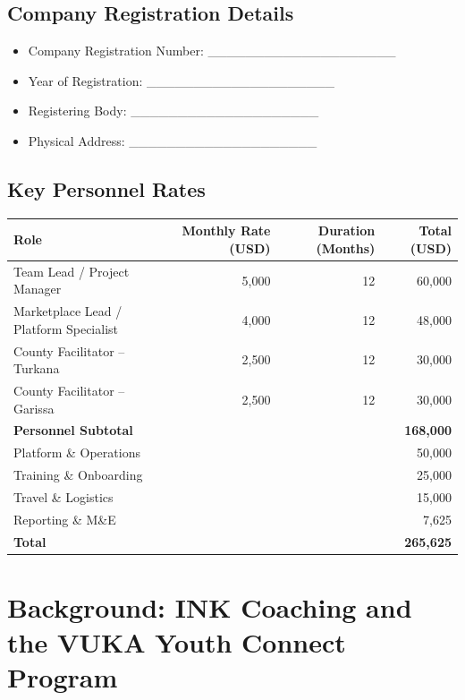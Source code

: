 \documentclass[11pt,a4paper]{article}
\begin{document}
\subsection{Company Registration Details}
\begin{itemize}[leftmargin=*]
    \item Company Registration Number: \_\_\_\_\_\_\_\_\_\_\_\_\_\_\_\_\_\_\_\_
    \item Year of Registration: \_\_\_\_\_\_\_\_\_\_\_\_\_\_\_\_\_\_\_\_
    \item Registering Body: \_\_\_\_\_\_\_\_\_\_\_\_\_\_\_\_\_\_\_\_
    \item Physical Address: \_\_\_\_\_\_\_\_\_\_\_\_\_\_\_\_\_\_\_\_
\end{itemize}

\subsection{Key Personnel Rates}
\begin{longtable}{@{}lrrr@{}}
\textbf{Role} & \textbf{Monthly Rate (USD)} & \textbf{Duration (Months)} & \textbf{Total (USD)} \\
\hline
Team Lead / Project Manager & 5,000 & 12 & 60,000 \\
Marketplace Lead / Platform Specialist & 4,000 & 12 & 48,000 \\
County Facilitator -- Turkana & 2,500 & 12 & 30,000 \\
County Facilitator -- Garissa & 2,500 & 12 & 30,000 \\
\hline
\textbf{Personnel Subtotal} & & & \textbf{168,000} \\
Platform \& Operations & & & 50,000 \\
Training \& Onboarding & & & 25,000 \\
Travel \& Logistics & & & 15,000 \\
Reporting \& M\&E & & & 7,625 \\
\hline
\textbf{Total} & & & \textbf{265,625} \\
\end{longtable}

\newpage

\section*{Background: INK Coaching and the VUKA Youth Connect Program}
\end{document}
